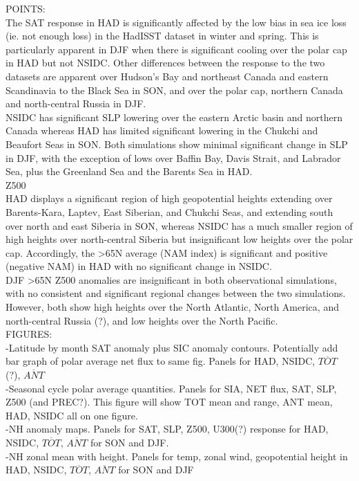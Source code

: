 \documentclass[twocol]{ametsoc}
\begin{document}
POINTS:\\
The SAT response in HAD is significantly affected by the low bias in sea ice loss (ie. not enough loss) in the HadISST dataset in winter and spring. This is particularly apparent in DJF when there is significant cooling over the polar cap in HAD but not NSIDC. Other differences between the response to the two datasets are apparent over Hudson's Bay and northeast Canada and eastern Scandinavia to the Black Sea in SON, and over the polar cap, northern Canada and north-central Russia in DJF. \\

NSIDC has significant SLP lowering over the eastern Arctic basin and northern Canada whereas HAD has limited significant lowering in the Chukchi and Beaufort Seas in SON. Both simulations show minimal significant change in SLP in DJF, with the exception of lows over Baffin Bay, Davis Strait, and Labrador Sea, plus the Greenland Sea and the Barents Sea in HAD.\\

Z500 \\
HAD displays a significant region of high geopotential heights extending over Barents-Kara, Laptev, East Siberian, and Chukchi Seas, and extending south over north and east Siberia in SON, whereas NSIDC has a much smaller region of high heights over north-central Siberia but insignificant low heights over the polar cap. Accordingly, the >65N average (NAM index) is significant and positive (negative NAM) in HAD with no significant change in NSIDC. \\
DJF >65N Z500 anomalies are insignificant in both observational simulations, with no consistent and significant regional changes between the two simulations. However, both show high heights over the North Atlantic, North America, and north-central Russia (?), and low heights over the North Pacific.\\

FIGURES:\\
-Latitude by month SAT anomaly plus SIC anomaly contours. Potentially add bar graph of polar average net flux to same fig. Panels for HAD, NSIDC, $\overline{TOT}$ (?), $\overline{ANT}$\\
-Seasonal cycle polar average quantities. Panels for SIA, NET flux, SAT, SLP, Z500 (and PREC?). This figure will show TOT mean and range, ANT mean, HAD, NSIDC all on one figure.\\
-NH anomaly maps. Panels for SAT, SLP, Z500, U300(?) response for HAD, NSIDC, $\overline{TOT}$, $\overline{ANT}$ for SON and DJF.\\
-NH zonal mean with height. Panels for temp, zonal wind, geopotential height in HAD, NSIDC, $\overline{TOT}$, $\overline{ANT}$ for SON and DJF \\
\end{document}

